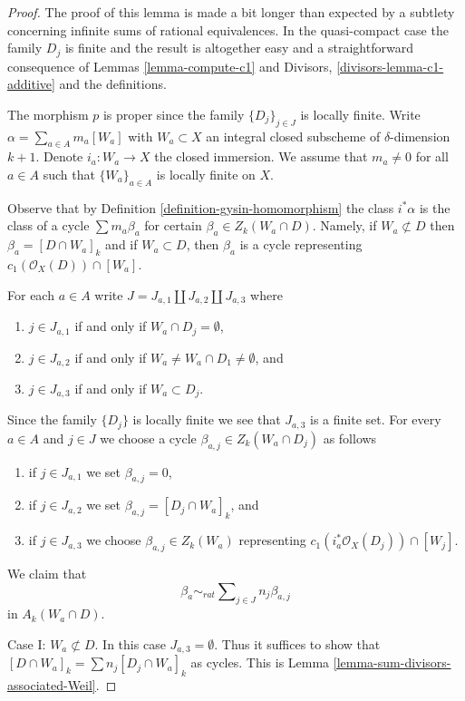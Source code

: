 \begin{proof}
The proof of this lemma is made a bit longer than expected
by a subtlety concerning infinite sums of rational equivalences.
In the quasi-compact case the family $D_j$ is finite and the result
is altogether easy and a straightforward consequence of
Lemmas \ref{lemma-compute-c1} and
Divisors, \ref{divisors-lemma-c1-additive} and the definitions.

\medskip\noindent
The morphism $p$ is proper since the family $\{D_j\}_{j \in J}$
is locally finite. Write $\alpha = \sum_{a \in A} m_a [W_a]$
with $W_a \subset X$ an integral closed subscheme of
$\delta$-dimension $k + 1$.
Denote $i_a : W_a \to X$ the closed immersion.
We assume that $m_a \not = 0$ for all $a \in A$ such that
$\{W_a\}_{a \in A}$ is locally finite on $X$.

\medskip\noindent
Observe that
by Definition \ref{definition-gysin-homomorphism}
the class $i^*\alpha$ is the class of a cycle
$\sum m_a\beta_a$ for certain $\beta_a \in Z_k(W_a \cap D)$.
Namely, if $W_a \not \subset D$ then $\beta_a = [D \cap W_a]_k$
and if $W_a \subset D$, then $\beta_a$ is a cycle
representing $c_1(\mathcal{O}_X(D)) \cap [W_a]$.

\medskip\noindent
For each $a \in A$ write $J = J_{a, 1} \amalg J_{a, 2} \amalg J_{a, 3}$
where
\begin{enumerate}
\item $j \in J_{a, 1}$ if and only if $W_a \cap D_j = \emptyset$,
\item $j \in J_{a, 2}$ if and only if
$W_a \not = W_a \cap D_1 \not = \emptyset$, and
\item $j \in J_{a, 3}$ if and only if $W_a \subset D_j$.
\end{enumerate}
Since the family $\{D_j\}$ is locally finite we see that
$J_{a, 3}$ is a finite set. For every $a \in A$ and $j \in J$
we choose a cycle $\beta_{a, j} \in Z_k(W_a \cap D_j)$ as follows
\begin{enumerate}
\item if $j \in J_{a, 1}$ we set $\beta_{a, j} = 0$,
\item if $j \in J_{a, 2}$ we set $\beta_{a, j} = [D_j \cap W_a]_k$, and
\item if $j \in J_{a, 3}$ we choose $\beta_{a, j} \in Z_k(W_a)$
representing $c_1(i_a^*\mathcal{O}_X(D_j)) \cap [W_j]$.
\end{enumerate}
We claim that
$$
\beta_a \sim_{rat}
\sum\nolimits_{j \in J} n_j \beta_{a, j}
$$
in $A_k(W_a \cap D)$.

\medskip\noindent
Case I: $W_a \not \subset D$. In this case $J_{a, 3} = \emptyset$.
Thus it suffices to show that
$[D \cap W_a]_k = \sum n_j [D_j \cap W_a]_k$ as cycles.
This is Lemma \ref{lemma-sum-divisors-associated-Weil}.


\end{proof}
